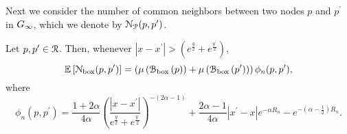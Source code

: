 %	
%	
%	
%    
%    
%    
%    
%    
%    
%    
%    
%    
%    
%    
%    

Next we consider the number of common neighbors between two nodes $p$ and $p^\prime$ in $G_{\infty}$, which we denote by ${\mathcal N}_{{\mathcal P}}(p,p^\prime)$. 

\begin{lemma}\label{lem:common_neighbors_Pcal_n}
Let $p, p^\prime \in {\mathcal R}$. Then, whenever $|x - x^\prime| > \left(e^{\frac{y}{2}} + e^{\frac{y^\prime}{2}}\right)$,
\[
	\mathbb{E}\left[{\mathcal N}_{\text{box}}(p,p^\prime)\right] = \left(\mu\left({\mathcal B}_{\text{box}}\left(p\right)\right) + \mu\left({\mathcal B}_{\text{box}}\left(p^\prime\right)\right)\right)\phi_n(p,p^\prime),
\]
where
\[
	\phi_n(p,p^\prime) = \frac{1 + 2\alpha}{4\alpha}\left(\frac{|x - x^\prime|}{e^{\frac{y}{2}} + e^{\frac{y^\prime}{2}}}\right)^{-(2\alpha - 1)} 
	+ \frac{2\alpha - 1}{4\alpha}|x^\prime - x|e^{-\alpha R_n} - e^{-(\alpha - \frac{1}{2})R_n}. 
\]
\end{lemma}

